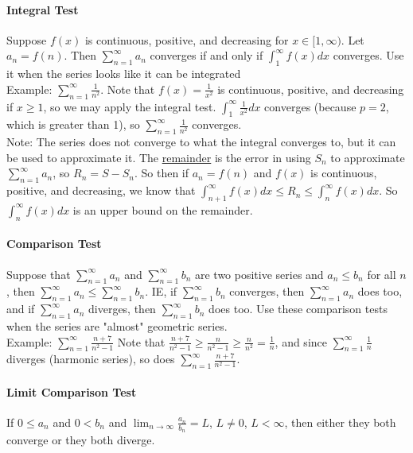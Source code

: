 \documentclass[10pt,letter]{article}
\begin{document}
\paragraph{Integral Test} Suppose $f(x)$ is continuous, positive, and decreasing for $x\in[1,\infty)$. Let $a_n=f(n)$. Then $\sum_{n=1}^\infty a_n$ converges if and only if $\int_1^\infty f(x)dx$ converges. Use it when the series looks like it can be integrated \\ 
Example: $\sum_{n=1}^\infty \frac{1}{n^2}$. Note that $f(x)=\frac{1}{x^2}$ is continuous, positive, and decreasing if $x\geq1$, so we may apply the integral test. $\int_1^\infty \frac{1}{x^2}dx$ converges (because $p=2$, which is greater than 1), so $\sum_{n=1}^\infty \frac{1}{n^2}$ converges. \\ 
Note: The series does not converge to what the integral converges to, but it can be used to approximate it. The \underline{remainder} is the error in using $S_n$ to approximate $\sum_{n=1}^\infty a_n$, so $R_n=S-S_n$. So then if $a_n=f(n)$ and $f(x)$ is continuous, positive, and decreasing, we know that $\int_{n+1}^\infty f(x)dx\leq R_n\leq \int_n^\infty f(x)dx$. So $\int_n^\infty f(x)dx$ is an upper bound on the remainder.  

\paragraph{Comparison Test} Suppose that $\sum_{n=1}^\infty a_n$ and $\sum_{n=1}^\infty b_n$ are two positive series and $a_n\leq b_n$ for all $n$, then $\sum_{n=1}^\infty a_n \leq \sum_{n=1}^\infty b_n$. IE, if $\sum_{n=1}^\infty b_n$ converges, then $\sum_{n=1}^\infty a_n$ does too, and if $\sum_{n=1}^\infty a_n$ diverges, then  $\sum_{n=1}^\infty b_n$ does too. Use these comparison tests when the series are "almost" geometric series.\\ 
Example:  $\sum_{n=1}^\infty \frac{n+7}{n^2-1}$ Note that $\frac{n+7}{n^2-1}\geq\frac{n}{n^2-1}\geq\frac{n}{n^2}=\frac{1}{n}$, and since  $\sum_{n=1}^\infty \frac{1}{n}$ diverges (harmonic series), so does  $\sum_{n=1}^\infty \frac{n+7}{n^2-1}$. 

\paragraph{Limit Comparison Test} If $0\leq a_n$ and $0<b_n$ and $\lim_{n\rightarrow\infty}\frac{a_n}{b_n}=L$, $L\neq0$, $L<\infty$, then either they both converge or they both diverge. 

\pagebreak
\end{document}
